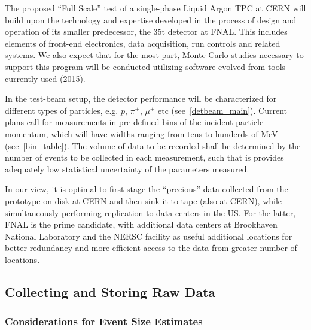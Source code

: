 
The proposed ``Full Scale'' test of a single-phase Liquid Argon TPC at CERN will build upon the technology and expertise developed in the
process of design and operation of its smaller predecessor, the 35t detector at FNAL.
This includes elements of front-end electronics, data acquisition, run controls and related systems. We also expect that for the most part,
Monte Carlo studies necessary to support this program will be conducted utilizing software evolved from tools currently used (2015).

In the test-beam setup, the detector performance will be characterized for different types of particles, e.g. $p$, $\pi^{\pm}$, $\mu^{\pm}$ etc (see~\ref{detbeam_main}).
Current plans call for measurements in pre-defined bins of the incident particle momentum, which will have widths ranging from tens to
hunderds of MeV (see~\ref{bin_table}). The volume of data to be recorded shall be determined by the number of events to be collected in each measurement, such that is
provides adequately low statistical uncertainty of the parameters measured.

In our view, it is optimal to first stage the ``precious'' data collected from the prototype on disk at CERN and then sink it to tape (also at CERN),
while simultaneously performing replication to data centers in the US. For the latter, FNAL is the prime candidate, with additional data centers at Brookhaven National Laboratory
and the NERSC facility as useful additional locations for better redundancy and more efficient access to the data from greater number of locations.

\subsection{Collecting and Storing Raw Data}

\subsubsection{Considerations for Event Size Estimates}

